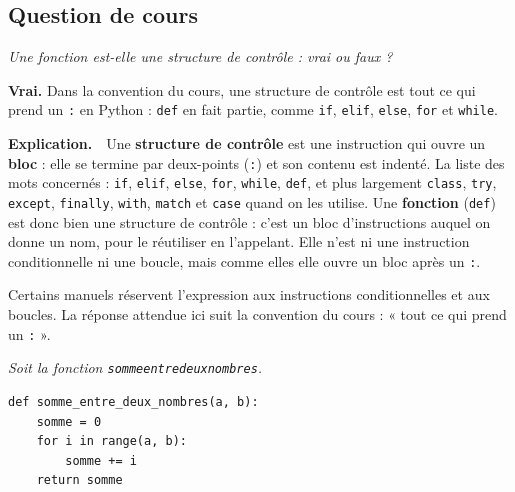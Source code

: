 \documentclass[addpoints, 11pt]{exam}
\newcommand{\enonce}[1]{\textit{#1}\par\smallskip}
\newcommand{\explication}{\par\smallskip\noindent\textbf{Explication.}\ }
\newcommand{\code}[1]{\texttt{#1}}
\DeclareRobustCommand{\_}{\textunderscore\allowbreak}
\begin{document}
\begin{questions}

\section{Question de cours}

\question[1] \enonce{Une fonction est-elle une structure de contrôle : vrai ou faux ?}
\begin{reponse}
\textbf{Vrai.} Dans la convention du cours, une structure de contrôle est tout ce qui prend un \code{:} en Python : \code{def} en fait partie, comme \code{if}, \code{elif}, \code{else}, \code{for} et \code{while}.
\end{reponse}
\explication\ Une \textbf{structure de contrôle} est une instruction qui ouvre un \textbf{bloc} : elle se termine par deux-points (\code{:}) et son contenu est indenté. La liste des mots concernés : \code{if}, \code{elif}, \code{else}, \code{for}, \code{while}, \code{def}, et plus largement \code{class}, \code{try}, \code{except}, \code{finally}, \code{with}, \code{match} et \code{case} quand on les utilise. Une \textbf{fonction} (\code{def}) est donc bien une structure de contrôle : c'est un bloc d'instructions auquel on donne un nom, pour le réutiliser en l'appelant. Elle n'est ni une instruction conditionnelle ni une boucle, mais comme elles elle ouvre un bloc après un \code{:}.
\begin{remarque}
Certains manuels réservent l'expression aux instructions conditionnelles et aux boucles. La réponse attendue ici suit la convention du cours : « tout ce qui prend un \code{:} ».
\end{remarque}

\question[3] \enonce{Soit la fonction \code{somme\_entre\_deux\_nombres}.}
\begin{lstlisting}
def somme_entre_deux_nombres(a, b):
    somme = 0
    for i in range(a, b):
        somme += i
    return somme
\end{lstlisting}
\end{questions}
\end{document}
